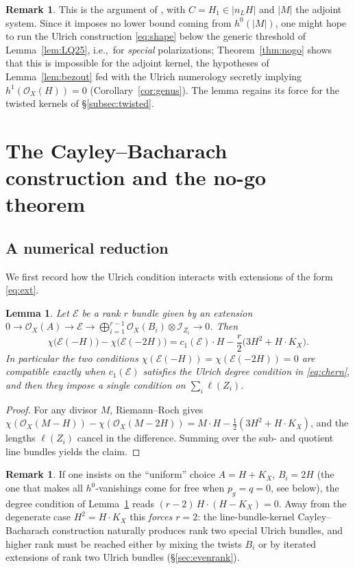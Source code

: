 \documentclass{amsart}
\newtheorem{lemma}[theorem]{Lemma}
\theoremstyle{definition}
\newtheorem{remark}[theorem]{Remark}
\newcommand{\OO}{\mathcal{O}}
\newcommand{\EE}{\mathcal{E}}
\newcommand{\II}{\mathcal{I}}
\newcommand{\len}{\ell}
\begin{document}
\begin{remark}\label{rem:anghel-role}
This is the argument of \cite[Th\'eor\`eme~2.2]{An94}, with $C=H_1\in|n_LH|$ and $|M|$ the adjoint system. Since it imposes no lower bound coming from $h^0(|M|)$, one might hope to run the Ulrich construction \eqref{eq:shape} below the generic threshold of Lemma~\ref{lem:LQ25}, i.e.,\ for \emph{special} polarizations; Theorem~\ref{thm:nogo} shows that this is impossible for the adjoint kernel, the hypotheses of Lemma~\ref{lem:bezout} fed with the Ulrich numerology secretly implying $h^1(\OO_X(H))=0$ (Corollary~\ref{cor:genus}). The lemma regains its force for the twisted kernels of \S\ref{subsec:twisted}.
\end{remark}

\section{The Cayley--Bacharach construction and the no-go theorem}\label{sec:ulrich}

\subsection{A numerical reduction}
We first record how the Ulrich condition interacts with extensions of the form \eqref{eq:ext}.

\begin{lemma}\label{lem:consistency}
Let $\EE$ be a rank $r$ bundle given by an extension
$0\to\OO_X(A)\to\EE\to\bigoplus_{i=1}^{r-1}\OO_X(B_i)\otimes\II_{Z_i}\to 0$. Then
\[
\chi\bigl(\EE(-H)\bigr)-\chi\bigl(\EE(-2H)\bigr)
= c_1(\EE)\cdot H-\frac{r}{2}\bigl(3H^2+H\cdot K_X\bigr).
\]
In particular the two conditions $\chi(\EE(-H))=\chi(\EE(-2H))=0$ are compatible exactly when $c_1(\EE)$ satisfies the Ulrich degree condition in \eqref{eq:chern}, and then they impose a single condition on $\sum_i\len(Z_i)$.
\end{lemma}

\begin{proof}
For any divisor $M$, Riemann--Roch gives
$\chi(\OO_X(M-H))-\chi(\OO_X(M-2H))=M\cdot H-\tfrac12(3H^2+H\cdot K_X)$,
and the lengths $\len(Z_i)$ cancel in the difference. Summing over the sub- and quotient line bundles yields the claim.
\end{proof}

\begin{remark}\label{rem:rank2forced}
If one insists on the ``uniform'' choice $A=H+K_X$, $B_i=2H$ (the one that makes all $h^0$-vanishings come for free when $p_g=q=0$, see below), the degree condition of Lemma~\ref{lem:consistency} reads $(r-2)\,H\cdot(H-K_X)=0$. Away from the degenerate case $H^2=H\cdot K_X$ this \emph{forces $r=2$}: the line-bundle-kernel Cayley--Bacharach construction naturally produces rank two special Ulrich bundles, and higher rank must be reached either by mixing the twists $B_i$ or by iterated extensions of rank two Ulrich bundles (\S\ref{sec:evenrank}).
\end{remark}
\end{document}

